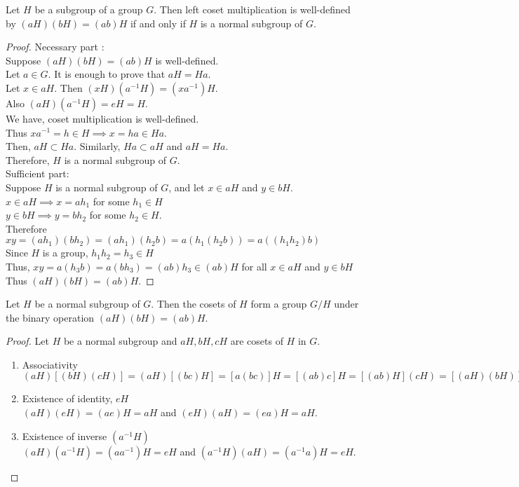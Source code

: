 \begin{theorem}
	Let $H$ be a subgroup of a group $G$. Then left coset multiplication is well-defined by $(aH)(bH) = (ab)H$ if and only if $H$ is a normal subgroup of $G$.
\end{theorem}
\begin{proof}
	Necessary part :\\
	Suppose $(aH)(bH) = (ab)H$ is well-defined.\\
	Let $a \in G$. It is enough to prove that $aH = Ha$.\\
	Let $x \in aH$. Then $(xH)(a^{-1}H) = (xa^{-1})H$.\\
	Also $(aH)(a^{-1}H) = eH = H$.\\
	We have, coset multiplication is well-defined.\\
	Thus $xa^{-1} = h \in H \implies x = ha \in Ha$.\\
	Then, $aH \subset Ha$. Similarly, $Ha \subset aH$ and $aH = Ha$.\\
	Therefore, $H$ is a normal subgroup of $G$.\\

	Sufficient part:\\
	Suppose $H$ is a normal subgroup of $G$, and let $x \in aH$ and $y \in bH$.\\
	$x \in aH \implies x = ah_1$ for some $h_1 \in H$\\
	$y \in bH \implies y = bh_2$ for some $h_2 \in H$.\\
	Therefore $xy = (ah_1)(bh_2) = (ah_1)(h_2b) = a(h_1(h_2b)) = a((h_1h_2)b)$\\
	Since $H$ is a group, $h_1h_2 = h_3 \in H$\\
	Thus, $xy = a(h_3b) = a(bh_3) = (ab)h_3 \in (ab)H$ for all $x \in aH$ and $y \in bH$\\
	Thus $(aH)(bH) = (ab)H$.
\end{proof}

\begin{corollary}
	Let $H$ be a normal subgroup of $G$. Then the cosets of $H$ form a group $G/H$ under the binary operation $(aH)(bH) = (ab)H$.
\end{corollary}
\begin{proof}
	Let $H$ be a normal subgroup and $aH,bH,cH$ are cosets of $H$ in $G$.
	\begin{enumerate}[label=G\arabic*]
		\item Associativity\\
			$(aH)[(bH)(cH)] = (aH)[(bc)H] = [a(bc)]H = [(ab)c]H = [(ab)H](cH) = [(aH)(bH)](cH)$
		\item Existence of identity, $eH$\\
			$(aH)(eH) = (ae)H = aH$ and $(eH)(aH) = (ea)H = aH$.
		\item Existence of inverse $(a^{-1}H)$\\
			$(aH)(a^{-1}H) = (aa^{-1})H = eH$ and $(a^{-1}H)(aH) = (a^{-1}a)H = eH$.
	\end{enumerate}
\end{proof}


